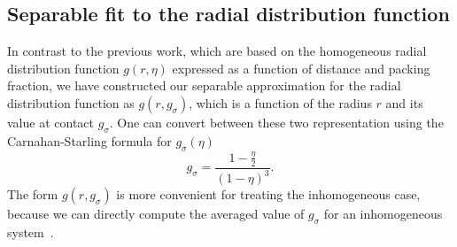 \documentclass[letterpaper,twocolumn,amsmath,amssymb,pre,aps,10pt]{revtex4-1}
\begin{document}
\subsection{Separable fit to the radial distribution function}

In contrast to the previous work, which are based on the homogeneous
radial distribution function $g(r,\eta)$ expressed as a function of
distance and packing fraction, we have constructed our separable
approximation for the radial distribution function as $g(r,
g_\sigma)$, which is a function of the radius $r$ and its value at
contact $g_\sigma$.  One can convert between these two representation
using the Carnahan-Starling formula for $g_\sigma(\eta)$
\begin{equation}
  g_\sigma = \frac{1-\tfrac{\eta}{2}}{(1-\eta)^3}.
\end{equation}
The form $g(r, g_\sigma)$ is more convenient for treating the
inhomogeneous case, because we can directly compute the averaged value
of $g_\sigma$ for an inhomogeneous system~\cite{schulte2012using}.
\end{document}

